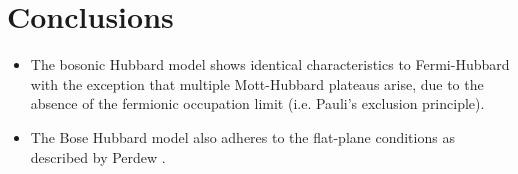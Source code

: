 \documentclass[twoside,twocolumn,9pt]{article}
\renewcommand{\refname}{Notes and references}
\begin{document}
\section{Conclusions}

\begin{itemize}
  \item The bosonic Hubbard model shows identical characteristics to Fermi-Hubbard with the exception that multiple Mott-Hubbard plateaus arise, due to the absence of the fermionic occupation limit (i.e. Pauli's exclusion principle).
  \item The Bose Hubbard model also adheres to the flat-plane conditions as described by Perdew \cite{perdew1982}.
\end{itemize}





\balance


\end{document}
